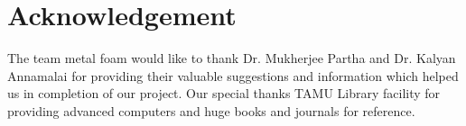 \documentclass[compileTAMUreport.tex]{subfiles}
\begin{document}
\section{Acknowledgement} 

The team metal foam would like to thank Dr. Mukherjee Partha and Dr. Kalyan Annamalai for providing their valuable suggestions and information which helped us in completion of our project. Our special thanks  TAMU Library facility for providing advanced computers and huge books and journals for reference.
\end{document}
